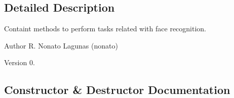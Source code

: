 \subsection{Detailed Description}
Containt methods to perform tasks related with face recognition. 

\begin{DoxyAuthor}{Author}
R. Nonato Lagunas (nonato) 
\end{DoxyAuthor}
\begin{DoxyVersion}{Version}
0. 
\end{DoxyVersion}


\subsection{Constructor \& Destructor Documentation}
